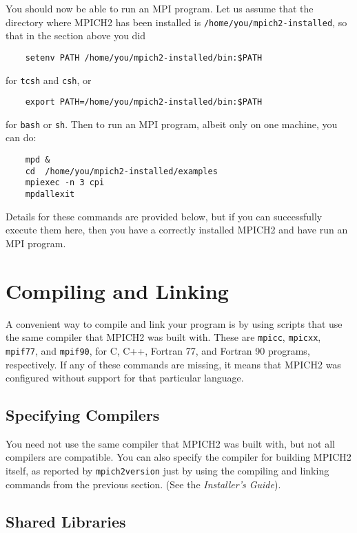 \documentclass[dvipdfm,11pt]{article}
\begin{document}
You should now be able to run an MPI program.  Let us assume that the
directory where MPICH2 has been installed is
\texttt{/home/you/mpich2-installed}, so that in the section above you
did
\begin{verbatim}
    setenv PATH /home/you/mpich2-installed/bin:$PATH
\end{verbatim}
for \texttt{tcsh} and \texttt{csh}, or 
\begin{verbatim}
    export PATH=/home/you/mpich2-installed/bin:$PATH
\end{verbatim}
for \texttt{bash} or \texttt{sh}.
Then to run an MPI program, albeit only on one machine, you can do:
\begin{verbatim}
    mpd &
    cd  /home/you/mpich2-installed/examples
    mpiexec -n 3 cpi
    mpdallexit
\end{verbatim}
Details for these commands are provided below, but if you can
successfully execute them here, then you have a correctly installed
MPICH2 and have run an MPI program. 

\section{Compiling and Linking}
\label{sec:compiling}

A convenient way to compile and link your program is by using scripts
that use the same compiler that MPICH2 was built with.  These are
\texttt{mpicc}, \texttt{mpicxx}, \texttt{mpif77}, and \texttt{mpif90},
for C, C++, Fortran 77, and Fortran 90 programs, respectively.  If any
of these commands are missing, it means that MPICH2 was configured
without support for that particular language.

\subsection{Specifying Compilers}
\label{sec:specifying-compilers}

You need not use the same compiler that MPICH2 was built with, but not
all compilers are compatible.  You can also specify the compiler for
building MPICH2 itself, as reported by \texttt{mpich2version} just by
using the compiling and linking commands from the previous section.
(See the \emph{Installer's Guide}).

\subsection{Shared Libraries}
\label{sec:shared-libraries}
\end{document}
